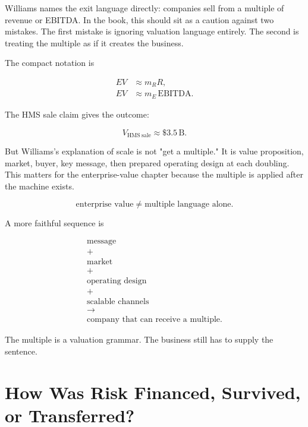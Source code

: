 \documentclass[11pt,oneside]{book}
\begin{document}
Williams names the exit language directly: companies sell from a multiple of revenue or EBITDA. In the book, this should sit as a caution against two mistakes. The first mistake is ignoring valuation language entirely. The second is treating the multiple as if it creates the business.

The compact notation is

\begin{align}
EV &\approx m_R R,\\
EV &\approx m_E\,\mathrm{EBITDA}.
\end{align}

The HMS sale claim gives the outcome:

\begin{equation}
V_{\mathrm{HMS\ sale}}\approx \$3.5\,\mathrm{B}.
\end{equation}

But Williams's explanation of scale is not "get a multiple." It is value proposition, market, buyer, key message, then prepared operating design at each doubling. This matters for the enterprise-value chapter because the multiple is applied after the machine exists.

\begin{equation}
\text{enterprise value}
\neq
\text{multiple language alone}.
\end{equation}

A more faithful sequence is

\begin{equation}
\begin{gathered}
\text{message}\\
+\\
\text{market}\\
+\\
\text{operating design}\\
+\\
\text{scalable channels}\\
\longrightarrow\\
\text{company that can receive a multiple}.
\end{gathered}
\end{equation}

The multiple is a valuation grammar. The business still has to supply the sentence.

\chapter{How Was Risk Financed, Survived, or Transferred?}
\end{document}
